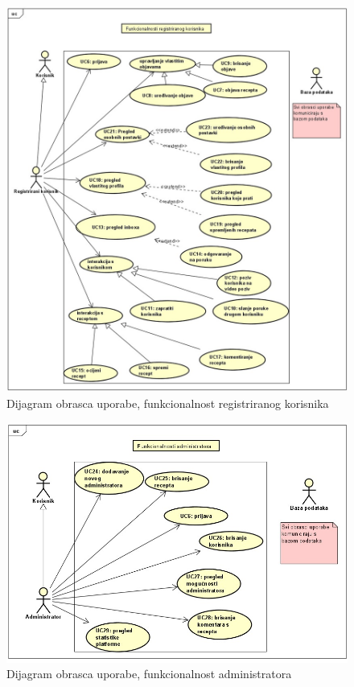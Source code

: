 					\begin{figure}[H]
						\includegraphics[scale=0.5]{slike/UC_reg.jpeg} %
						\centering
						\caption{Dijagram obrasca uporabe, funkcionalnost registriranog korisnika}
						\label{fig:UC_diagram2}
					\end{figure}

					\begin{figure}[H]
						\includegraphics[scale=0.5]{slike/UC_admin.jpeg} %
						\centering
						\caption{Dijagram obrasca uporabe, funkcionalnost administratora}
						\label{fig:UC_diagram3}
					\end{figure}
				\eject		
				
